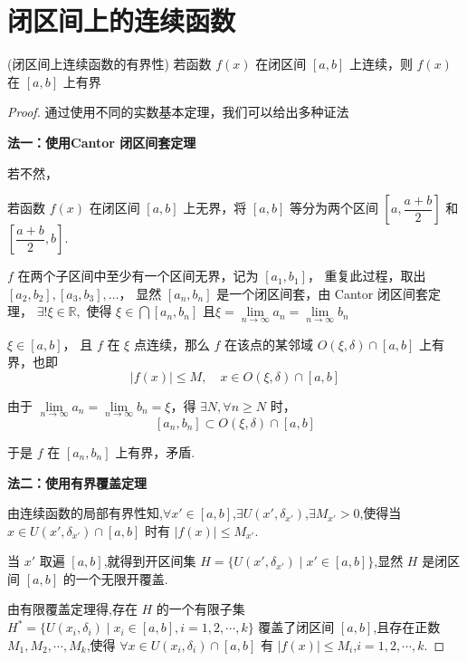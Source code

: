 \section{闭区间上的连续函数}
\begin{proposition}(闭区间上连续函数的有界性)
	若函数 \( f(x) \) 在闭区间 \([a, b]\) 上连续，则 \( f(x) \) 在 \([a, b]\) 上有界
	\label{limprocinfunc;p}
	
\end{proposition}
\begin{proof}通过使用不同的实数基本定理，我们可以给出多种证法
	
	\textbf{法一：使用Cantor 闭区间套定理}
	
	若不然，
	
	若函数 \( f(x) \) 在闭区间 \([a, b]\) 上无界，将 \([a, b]\) 等分为两个区间 \([a, \dfrac{a+b}{2}]\) 和 \([\dfrac{a+b}{2}, b]\).
	
	\(f\) 在两个子区间中至少有一个区间无界，记为 \([a_1, b_1]\)，
	重复此过程，取出 \([a_2, b_2], [a_3, b_3], \dots\)，
	显然 \([a_n, b_n]\) 是一个闭区间套，由 Cantor 闭区间套定理，
	\(\exists ! \xi \in \mathbb{R}, \text{ 使得 } \xi \in \bigcap[a_n, b_n]\) 且$\xi=\lim\limits_{n\to\infty}a_n=\lim\limits_{n\to\infty}b_n$
	
	\(\xi \in [a, b]\)，
	且 \(f\) 在 \(\xi\) 点连续，那么 \(f\) 在该点的某邻域 \(O(\xi, \delta) \cap [a, b]\) 上有界，也即
	\[ |f(x)| \leqslant M, \quad x \in O(\xi, \delta) \cap [a, b] \]
	
	由于 \(\lim\limits_{n \to \infty} a_n = \lim\limits_{n \to \infty} b_n = \xi\)，得 \(\exists N, \forall n \ge N\) 时，
	\[ [a_n, b_n] \subset O(\xi, \delta) \cap [a, b] \]
	
	于是 \(f\) 在 \([a_n, b_n]\) 上有界，矛盾.
	
	\textbf{法二：使用有界覆盖定理}
	
	由连续函数的局部有界性知,$\forall x' \in [a, b]$,$\exists U(x', \delta_{x'})$,$\exists M_{x'} > 0$,使得当 $x \in U(x', \delta_{x'}) \cap [a, b]$ 时有 $|f(x)| \leqslant M_{x'}$.
	
	当 $x'$ 取遍 $[a, b]$,就得到开区间集 $H = \{U(x', \delta_{x'}) \mid x' \in [a, b]\}$,显然 $H$ 是闭区间 $[a, b]$ 的一个无限开覆盖.
	
	由有限覆盖定理得,存在 $H$ 的一个有限子集 $H^* = \{U(x_i, \delta_i) \mid x_i \in [a, b], i = 1, 2, \cdots, k\}$ 覆盖了闭区间 $[a, b]$,且存在正数 $M_1, M_2, \cdots, M_k$,使得 $\forall x \in U(x_i, \delta_i) \cap [a, b]$ 有 $|f(x)| \leqslant M_i$,$i = 1, 2, \cdots, k$.
	

\end{proof}
